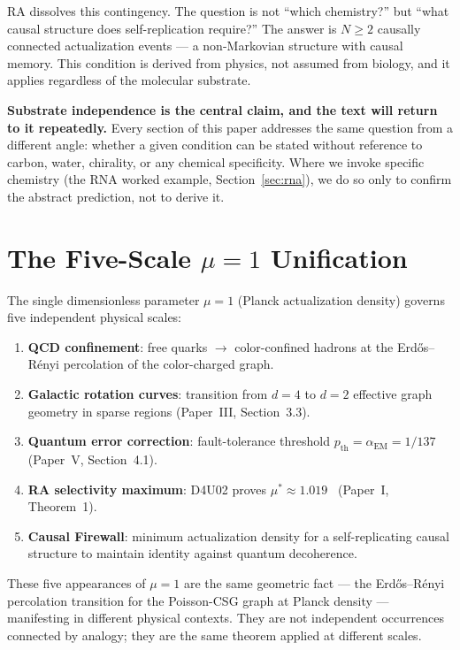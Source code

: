 \documentclass[12pt,a4paper]{article}
\begin{document}
RA dissolves this contingency.  The question is not ``which chemistry?'' but ``what causal structure does self-replication require?''  The answer is $N \geq 2$ causally connected actualization events — a non-Markovian structure with causal memory.  This condition is derived from physics, not assumed from biology, and it applies regardless of the molecular substrate.

\textbf{Substrate independence is the central claim, and the text will return to it repeatedly.}  Every section of this paper addresses the same question from a different angle: whether a given condition can be stated without reference to carbon, water, chirality, or any chemical specificity.  Where we invoke specific chemistry (the RNA worked example, Section~\ref{sec:rna}), we do so only to confirm the abstract prediction, not to derive it.

\section{The Five-Scale $\mu=1$ Unification}

The single dimensionless parameter $\mu=1$ (Planck actualization density) governs five independent physical scales:

\begin{enumerate}
  \item \textbf{QCD confinement}: free quarks $\to$ color-confined hadrons at the Erd\H{o}s--R\'enyi percolation of the color-charged graph.
  \item \textbf{Galactic rotation curves}: transition from $d=4$ to $d=2$ effective graph geometry in sparse regions (Paper~III, Section~3.3).
  \item \textbf{Quantum error correction}: fault-tolerance threshold $p_{\mathrm{th}} = \alpha_{\mathrm{EM}} = 1/137$ (Paper~V, Section~4.1).
  \item \textbf{RA selectivity maximum}: D4U02 proves $\mu^* \approx 1.019$ \statusDR\ (Paper~I, Theorem~1).
  \item \textbf{Causal Firewall}: minimum actualization density for a self-replicating causal structure to maintain identity against quantum decoherence.
\end{enumerate}

These five appearances of $\mu=1$ are the same geometric fact — the Erd\H{o}s--R\'enyi percolation transition for the Poisson-CSG graph at Planck density — manifesting in different physical contexts.  They are not independent occurrences connected by analogy; they are the same theorem applied at different scales.
\end{document}
